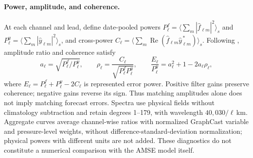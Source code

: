 \documentclass{article}
\newcommand{\vfourchange}[1]{{\color{blue}#1}}
\newcommand{\vfourred}[1]{{\color{red}#1}}
\newif\ifvfivechanges
\newcommand{\vfiveidentity}[1]{#1}
\DeclareRobustCommand{\vfiveadded}[1]{\ifvfivechanges{\color{vfiveAdded}%
  \let\vfourchange\vfiveidentity\let\vfourred\vfiveidentity#1}\else{\color{blue}%
  \let\vfourchange\vfiveidentity\let\vfourred\vfiveidentity#1}\fi}
\begin{document}
\paragraph{\vfourred{Power, amplitude, and coherence.}}
\vfourred{At each channel and lead, define date-pooled powers $P^f_\ell=\langle\sum_m|\widehat f_{\ell m}|^2\rangle_s$ and $P^y_\ell=\langle\sum_m|\widehat y_{\ell m}|^2\rangle_s$, and cross-power $C_\ell=\langle\sum_m\operatorname{Re}(\widehat f_{\ell m}\widehat y_{\ell m}^{\,*})\rangle_s$. Following \citet{subich2025spectral}, amplitude ratio and coherence satisfy}
\vfourred{\begin{equation}
a_\ell=\sqrt{P^f_\ell/P^y_\ell},\qquad
\rho_\ell=\frac{C_\ell}{\sqrt{P^f_\ell P^y_\ell}},\qquad
\frac{E_\ell}{P^y_\ell}=a_\ell^2+1-2a_\ell\rho_\ell,
\label{eq:spectral_diagnostics}
\end{equation}}
\vfourred{where $E_\ell=P^f_\ell+P^y_\ell-2C_\ell$ is represented error power. Positive filter gains preserve coherence; negative gains reverse its sign. Thus matching amplitudes alone does not imply matching forecast errors. Spectra use physical fields without climatology subtraction and retain degrees 1--179, with wavelength $40{,}030/\ell$\,km. Aggregate curves average channel-wise ratios with normalized GraphCast variable and pressure-level weights, without difference-standard-deviation normalization; physical powers with different units are not added. These diagnostics do not constitute a numerical comparison with the AMSE model itself.}
\end{document}
